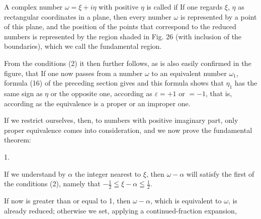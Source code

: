 
A complex number $\omega = \xi + i\eta$ with positive $\eta$ is called  if
If one regards $\xi$, $\eta$ as rectangular coordinates in a plane, then every number $\omega$ is represented by a point of this plane, and the position of the points that correspond to the reduced numbers is represented by the region shaded in Fig. 26 (with inclusion of the boundaries), which we call the fundamental region.


From the conditions (2) it then further follows, as is also easily confirmed in the figure, that
If one now passes from a number $\omega$ to an equivalent number $\omega_1$, formula (16) of the preceding section gives
and this formula shows that $\eta_1$ has the same sign as $\eta$ or the opposite one, according as $\varepsilon = +1$ or $=-1$, that is, according as the equivalence is a proper or an improper one.

If we restrict ourselves, then, to numbers with positive imaginary part, only proper equivalence comes into consideration, and we now prove the fundamental theorem:

1. 

If we understand by $\alpha$ the integer nearest to $\xi$, then $\omega-\alpha$ will satisfy the first of the conditions (2), namely that $-\tfrac12 \leqq \xi-\alpha \leqq \tfrac12$.

If now
is greater than or equal to 1, then $\omega-\alpha$, which is equivalent to $\omega$, is already reduced; otherwise we set, applying a continued-fraction expansion,

